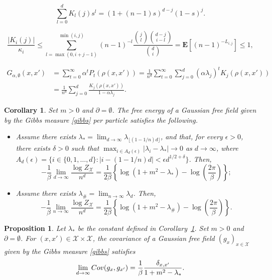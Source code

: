 \documentclass[10pt,a4paper]{amsart}
\newtheorem{corollary}{Corollary}
\newtheorem{proposition}{Proposition}
\begin{document}
\begin{equation}\label{gen}
  \sum_{l=0}^dK_l(j)s^l=(1+(n-1)s)^{d-j}(1-s)^j.
\end{equation}

\begin{equation}\label{Kbound}
  \frac{|K_i(j)|}{\kappa_i}\le
  \sum_{l=\max(0,i+j-1)}^{\min(i,j)}(n-1)^{-l}
  \frac{\binom{j}{l}\binom{d-j}{i-l}}{\binom{d}{i}}
  =\mathbf{E}[(n-1)^{-{L_{i,j}}}]\le 1,
\end{equation}

\begin{align}
  G_{\alpha,\emptyset}(x,x')
  &=\sum_{t=0}^\infty \alpha^t P_t(\rho(x,x'))
  =\frac{1}{n^d}\sum_{t=0}^\infty\sum_{j=0}^d
  (\alpha\lambda_j)^t K_j(\rho(x,x'))\nonumber\\
  &=\frac{1}{n^d}\sum_{j=0}^d\frac{K_j(\rho(x,x'))}
  {1-\alpha\lambda_j}. \label{green_h}
\end{align}

\begin{corollary}\label{cor:lim}
  Set $m>0$ and $\partial=\emptyset$. The free energy of
  a Gaussian free field given by the Gibbs measure
  \eqref{gibbs} per particle satisfies the following.
  \begin{itemize}
  \item[$(i)$]     
  Assume there exists $\lambda_*=\lim_{d\to\infty}\lambda_{\lfloor(1-1/n)d\rfloor}$, and that, for every $\epsilon>0$, there exists
  $\delta>0$ such that
  $\max_{i\in A_d(\epsilon)}|\lambda_i-\lambda_*|\to 0$ as
  $d\to\infty$, where
  $A_d(\epsilon)=\{i\in\{0,1,\ldots,d\}:|i-(1-1/n)d|<\epsilon d^{1/2+\delta}\}$.
  Then,
  \begin{equation*}
    -\frac{1}{\beta}
    \lim_{d\to\infty}\frac{\log Z_{\mathcal{X}}}{n^d}
    =\frac{1}{2\beta}\left\{\log(1+m^2-\lambda_{*})
    -\log\left(\frac{2\pi}{\beta}\right)\right\};
  \end{equation*}
  \item[$(ii)$]
  Assume there exists
  $\lambda_{\#}=\lim_{n\to\infty}\lambda_d$. Then,
  \begin{equation*}
    -\frac{1}{\beta}
    \lim_{n\to\infty}\frac{\log Z_{\mathcal{X}}}{n^d}
    =\frac{1}{2\beta}\left\{\log(1+m^2-\lambda_\#)-
    \log\left(\frac{2\pi}{\beta}\right)\right\}.
  \end{equation*}
  \end{itemize}
\end{corollary}  

\begin{proposition}\label{pro:limcovd}
  Let $\lambda_*$ be the constant defined in Corollary~\ref{cor:lim}.
  Set $m>0$ and $\partial=\emptyset$.
  For $(x,x')\in\mathcal{X}\times\mathcal{X}$, the covariance
  of a Gaussian free field $(g_x)_{x\in\mathcal{X}}$ given
  by the Gibbs measure \eqref{gibbs} satisfies
  \begin{equation*}
    \lim_{d\to\infty}{\rm Cov}(g_x,g_{x'})=\frac{1}{\beta}
    \frac{\delta_{x,x'}}{1+m^2-\lambda_*}.
  \end{equation*}
\end{proposition}
\end{document}
